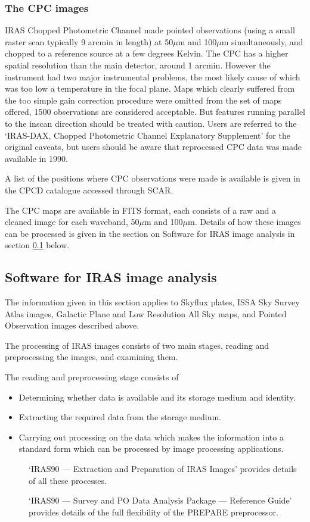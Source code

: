 \documentclass[11pt,nolof,noabs]{starlink}
\begin{document}
\subsubsection{The CPC images}
IRAS Chopped Photometric Channel made pointed observations (using a small
raster scan typically 9 arcmin in length) at 50$\mu$m and 100$\mu$m
simultaneously, and chopped to a reference source at a few degrees Kelvin. The
CPC has a higher spatial resolution than the main detector, around 1 arcmin.
However
the instrument had two major instrumental problems, the most likely cause of
which was too low a temperature in the focal plane. Maps which clearly suffered
from the too simple gain correction procedure were omitted from the set of
maps offered, 1500 observations are considered acceptable. But features running
parallel to the inscan direction should be treated with caution. Users are
referred to the `IRAS-DAX, Chopped Photometric Channel Explanatory Supplement'
for the original caveats, but users should be aware that reprocessed CPC data
was made available in 1990.

A list of the positions where CPC observations were made is available is given
in the CPCD catalogue accessed through SCAR.

The CPC maps are available in FITS format, each consists of a raw and a cleaned
image for each waveband, 50$\mu$m and 100$\mu$m. Details of how these images can
be processed is given in the section on Software for IRAS image analysis in
section \ref{m:imsoft} below.

\subsection{Software for IRAS image analysis}
\label{m:imsoft}
The information given in this section applies to Skyflux plates, ISSA Sky Survey
Atlas images, Galactic Plane and Low Resolution All Sky maps, and Pointed
Observation images described above.

The processing of IRAS images consists of two main stages, reading and
preprocessing the images, and examining them.

The reading and preprocessing stage consists of
\begin{itemize}
\item Determining whether data is available and its storage medium and identity.
\item Extracting the required data from the storage medium.
\item Carrying out processing on the data which makes the information into a
standard form which can be processed by image processing applications.
\end{itemize}
\begin{description}
\item [] `IRAS90 --- Extraction and
Preparation of IRAS Images' provides details of all these
processes.
\item [] `IRAS90 --- Survey and PO Data Analysis Package --- Reference
Guide' provides details of the full flexibility of the PREPARE preprocessor.
\end{description}
\end{document}

